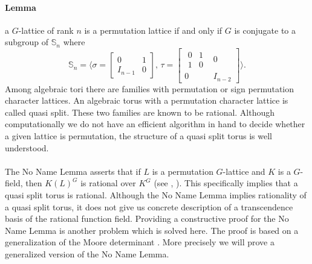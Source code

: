 \documentclass{article}
\theoremstyle{plain}
\theoremstyle{definition}
\begin{document}
\paragraph{Lemma}
a $G$-lattice of rank $n$ is a permutation lattice if and only if $G$ is conjugate to a subgroup of $\mathbb{S}_n$ where $$\mathbb{S}_n = \langle  \sigma = \left[ \begin{array}{c|c}
0 & 1\\
\hline
I_{n-1} &0
\end{array} \right] 
, \,
\tau = \left[ \begin{array}{c|c}
\begin{array}{cc}
0 & 1\\
1 & 0
\end{array} & 0\\
\hline
0 & I_{n-2}
\end{array}
\right] \rangle.$$
Among algebraic tori there are families with permutation or sign permutation character lattices. An algebraic torus with a permutation character lattice is called quasi split. These two families are known to be rational. Although computationally we do not have an efficient algorithm in hand to decide whether a given lattice is permutation, the structure of a quasi split torus is well understood.\\
\\
The No Name Lemma asserts that if $L$ is a permutation $G$-lattice and $K$ is a $G$-field, then $K(L)^G$ is rational over $K^G$ (see \cite{Lenstra}, \cite{Domokos}). This specifically implies that a quasi split torus is rational. Although the No Name Lemma implies rationality of a quasi split torus, it does not give us concrete description of a transcendence basis of the rational function field. Providing a constructive proof for the No Name Lemma is another problem which is solved here. The proof is based on a generalization of the Moore determinant \cite[Section 1.3]{Goss}. More precisely we will prove a generalized version of the No Name Lemma.\\
\\
\end{document}
